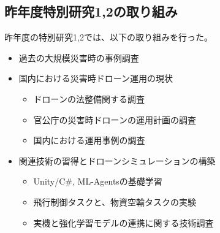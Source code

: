\documentclass{article}[jsarticle]
\begin{document}
\subsection{昨年度特別研究1,2の取り組み}
昨年度の特別研究1,2では、以下の取り組みを行った。
\begin{itemize}
    \item 過去の大規模災害時の事例調査
    \item 国内における災害時ドローン運用の現状
    \begin{itemize}
        \item ドローンの法整備関する調査
        \item 官公庁の災害時ドローンの運用計画の調査
        \item 国内における運用事例の調査
    \end{itemize}
    \item 関連技術の習得とドローンシミュレーションの構築
    \begin{itemize}
        \item Unity/C\#, ML-Agentsの基礎学習
        \item 飛行制御タスクと、物資空輸タスクの実験
        \item 実機と強化学習モデルの連携に関する技術調査
    \end{itemize}
\end{itemize}
\end{document}
